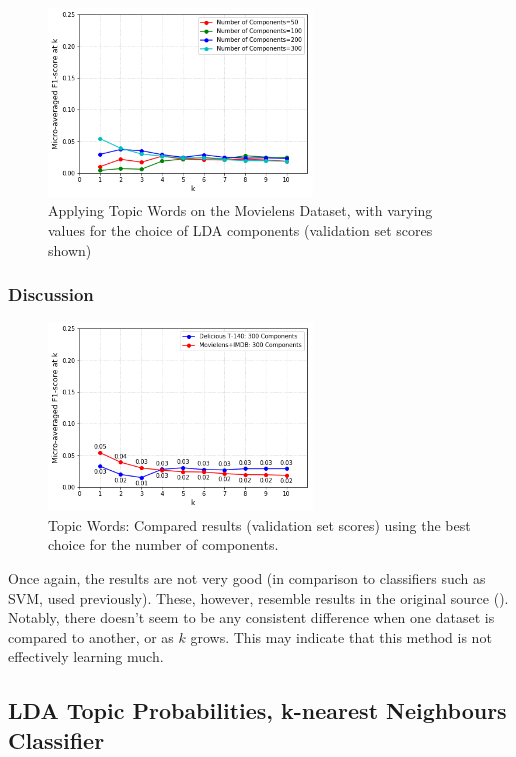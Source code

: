 \begin{figure}[H]
    \centering
    \includegraphics[width=7cm]{chapters/05_experiments/images/movielens-topic-words.png}
    \caption{Applying Topic Words on the Movielens Dataset, with varying values for the choice of LDA components (validation set scores shown)}
    \label{fig:topic_words_movielens}
\end{figure}

\subsubsection{Discussion}

\begin{figure}[H]
    \centering
    \includegraphics[width=7cm]{chapters/05_experiments/images/proposal-1-compared-topic-words.png}
    \caption{Topic Words: Compared results (validation set scores) using the best choice for the number of components.}
    \label{fig:compared_topic_words}
\end{figure}

Once again, the results are not very good (in comparison to classifiers such as SVM, used previously). These, however, resemble results in the original source (\citep{choubey_2011}). Notably, there doesn't seem to be any consistent difference when one dataset is compared to another, or as $k$ grows. This may indicate that this method is not effectively learning much.

\subsection{LDA Topic Probabilities, k-nearest Neighbours Classifier}\label{sub:lda_topics}

